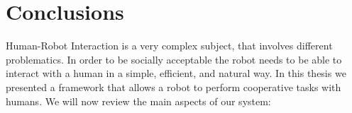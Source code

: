 
\chapter{Conclusions} %

\label{chapter-conclusions} %


Human-Robot Interaction is a very complex subject, that involves different problematics. In order to be socially acceptable the robot needs to be able to interact with a human in a simple, efficient, and natural way. In this thesis we presented a framework that allows a robot to perform cooperative tasks with humans. We will now review the main aspects of our system:

